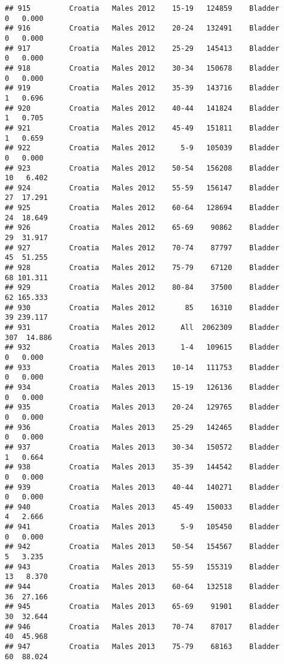 \documentclass[
]{article}
\begin{document}
\begin{verbatim}
## 915         Croatia   Males 2012    15-19   124859    Bladder      0   0.000
## 916         Croatia   Males 2012    20-24   132491    Bladder      0   0.000
## 917         Croatia   Males 2012    25-29   145413    Bladder      0   0.000
## 918         Croatia   Males 2012    30-34   150678    Bladder      0   0.000
## 919         Croatia   Males 2012    35-39   143716    Bladder      1   0.696
## 920         Croatia   Males 2012    40-44   141824    Bladder      1   0.705
## 921         Croatia   Males 2012    45-49   151811    Bladder      1   0.659
## 922         Croatia   Males 2012      5-9   105039    Bladder      0   0.000
## 923         Croatia   Males 2012    50-54   156208    Bladder     10   6.402
## 924         Croatia   Males 2012    55-59   156147    Bladder     27  17.291
## 925         Croatia   Males 2012    60-64   128694    Bladder     24  18.649
## 926         Croatia   Males 2012    65-69    90862    Bladder     29  31.917
## 927         Croatia   Males 2012    70-74    87797    Bladder     45  51.255
## 928         Croatia   Males 2012    75-79    67120    Bladder     68 101.311
## 929         Croatia   Males 2012    80-84    37500    Bladder     62 165.333
## 930         Croatia   Males 2012       85    16310    Bladder     39 239.117
## 931         Croatia   Males 2012      All  2062309    Bladder    307  14.886
## 932         Croatia   Males 2013      1-4   109615    Bladder      0   0.000
## 933         Croatia   Males 2013    10-14   111753    Bladder      0   0.000
## 934         Croatia   Males 2013    15-19   126136    Bladder      0   0.000
## 935         Croatia   Males 2013    20-24   129765    Bladder      0   0.000
## 936         Croatia   Males 2013    25-29   142465    Bladder      0   0.000
## 937         Croatia   Males 2013    30-34   150572    Bladder      1   0.664
## 938         Croatia   Males 2013    35-39   144542    Bladder      0   0.000
## 939         Croatia   Males 2013    40-44   140271    Bladder      0   0.000
## 940         Croatia   Males 2013    45-49   150033    Bladder      4   2.666
## 941         Croatia   Males 2013      5-9   105450    Bladder      0   0.000
## 942         Croatia   Males 2013    50-54   154567    Bladder      5   3.235
## 943         Croatia   Males 2013    55-59   155319    Bladder     13   8.370
## 944         Croatia   Males 2013    60-64   132518    Bladder     36  27.166
## 945         Croatia   Males 2013    65-69    91901    Bladder     30  32.644
## 946         Croatia   Males 2013    70-74    87017    Bladder     40  45.968
## 947         Croatia   Males 2013    75-79    68163    Bladder     60  88.024

\end{verbatim}
\end{document}
